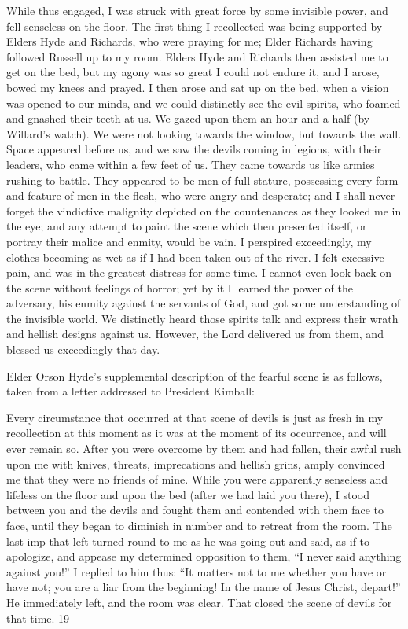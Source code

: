 While thus engaged, I was struck with great force by some invisible power, and fell senseless
on the floor. The first thing I recollected was being supported by Elders Hyde and Richards,
who were praying for me; Elder Richards having followed Russell up to my room. Elders
Hyde and Richards then assisted me to get on the bed, but my agony was so great I could not
endure it, and I arose, bowed my knees and prayed. I then arose and sat up on the bed, when
a vision was opened to our minds, and we could distinctly see the evil spirits, who foamed
and gnashed their teeth at us. We gazed upon them an hour and a half (by Willard's watch).
We were not looking towards the window, but towards the wall. Space appeared before us,
and we saw the devils coming in legions, with their leaders, who came within a few feet of
us. They came towards us like armies rushing to battle. They appeared to be men of full
stature, possessing every form and feature of men in the flesh, who were angry and
desperate; and I shall never forget the vindictive malignity depicted on the countenances as
they looked me in the eye; and any attempt to paint the scene which then presented itself, or
portray their malice and enmity, would be vain. I perspired exceedingly, my clothes
becoming as wet as if I had been taken out of the river. I felt excessive pain, and was in the
greatest distress for some time. I cannot even look back on the scene without feelings of
horror; yet by it I learned the power of the adversary, his enmity against the servants of God,
and got some understanding of the invisible world. We distinctly heard those spirits talk and
express their wrath and hellish designs against us. However, the Lord delivered us from
them, and blessed us exceedingly that day.

Elder Orson Hyde's supplemental description of the fearful scene is as follows, taken from a
letter addressed to President Kimball:

Every circumstance that occurred at that scene of devils is just as fresh in my recollection at
this moment as it was at the moment of its occurrence, and will ever remain so. After you
were overcome by them and had fallen, their awful rush upon me with knives, threats,
imprecations and hellish grins, amply convinced me that they were no friends of mine. While
you were apparently senseless and lifeless on the floor and upon the bed (after we had laid
you there), I stood between you and the devils and fought them and contended with them
face to face, until they began to diminish in number and to retreat from the room. The last
imp that left turned round to me as he was going out and said, as if to apologize, and appease
my determined opposition to them, ``I never said anything against you!'' I replied to him thus:
``It matters not to me whether you have or have not; you are a liar from the beginning! In the
name of Jesus Christ, depart!'' He immediately left, and the room was clear. That closed the
scene of devils for that time. 19

